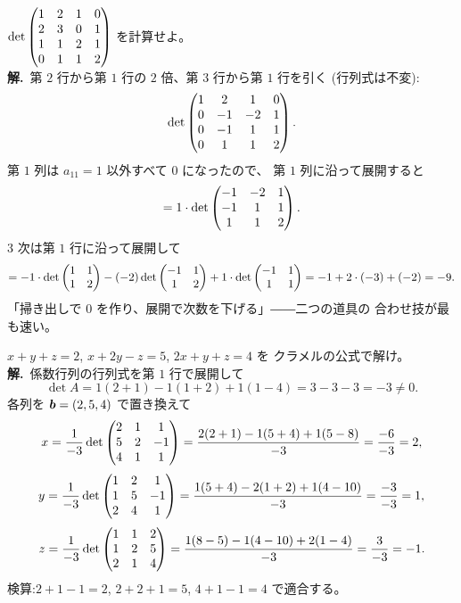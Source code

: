 \begin{rei}[例題・標準($0$ を作ってから展開する $4$ 次)]\label{rei:cof-4x4}
$\det \begin{pmatrix}1 & 2 & 1 & 0 \\ 2 & 3 & 0 & 1 \\ 1 & 1 & 2 & 1 \\ 0 & 1 & 1 & 2\end{pmatrix}$
を計算せよ。\\
\textbf{解.}\ 第 $2$ 行から第 $1$ 行の $2$ 倍、第 $3$ 行から第 $1$ 行を引く
(行列式は不変):
\[
\det \begin{pmatrix}1 & 2 & 1 & 0 \\ 0 & -1 & -2 & 1 \\ 0 & -1 & 1 & 1 \\ 0 & 1 & 1 & 2\end{pmatrix}.
\]
第 $1$ 列は $a_{11} = 1$ 以外すべて $0$ になったので、
第 $1$ 列に沿って展開すると
\[
= 1 \cdot \det \begin{pmatrix}-1 & -2 & 1 \\ -1 & 1 & 1 \\ 1 & 1 & 2\end{pmatrix}.
\]
$3$ 次は第 $1$ 行に沿って展開して
\[
= -1 \cdot \det\begin{pmatrix}1 & 1 \\ 1 & 2\end{pmatrix} - (-2) \det\begin{pmatrix}-1 & 1 \\ 1 & 2\end{pmatrix}
+ 1 \cdot \det\begin{pmatrix}-1 & 1 \\ 1 & 1\end{pmatrix}
= -1 + 2 \cdot (-3) + (-2) = -9.
\]
「掃き出しで $0$ を作り、展開で次数を下げる」――二つの道具の
合わせ技が最も速い。
\end{rei}

\begin{rei}[例題・標準(クラメルの公式・$3$ 元)]\label{rei:cof-cramer3}
$x + y + z = 2$, $x + 2y - z = 5$, $2x + y + z = 4$ を
クラメルの公式で解け。\\
\textbf{解.}\ 係数行列の行列式を第 $1$ 行で展開して
\[
\det A = 1 (2 + 1) - 1 (1 + 2) + 1 (1 - 4) = 3 - 3 - 3 = -3 \neq 0.
\]
各列を $\bm{b} = (2, 5, 4)$ で置き換えて
\[
x = \frac{1}{-3}\det \begin{pmatrix}2 & 1 & 1 \\ 5 & 2 & -1 \\ 4 & 1 & 1\end{pmatrix}
= \frac{2(2+1) - 1(5+4) + 1(5-8)}{-3} = \frac{-6}{-3} = 2,
\]
\[
y = \frac{1}{-3}\det \begin{pmatrix}1 & 2 & 1 \\ 1 & 5 & -1 \\ 2 & 4 & 1\end{pmatrix}
= \frac{1(5+4) - 2(1+2) + 1(4-10)}{-3} = \frac{-3}{-3} = 1,
\]
\[
z = \frac{1}{-3}\det \begin{pmatrix}1 & 1 & 2 \\ 1 & 2 & 5 \\ 2 & 1 & 4\end{pmatrix}
= \frac{1(8-5) - 1(4-10) + 2(1-4)}{-3} = \frac{3}{-3} = -1.
\]
検算:$2 + 1 - 1 = 2$, $2 + 2 + 1 = 5$, $4 + 1 - 1 = 4$ で適合する。
\end{rei}

